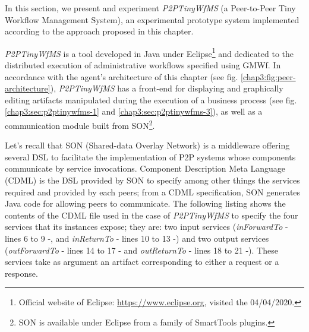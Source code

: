 \label{chap3:sec:p2ptinywfms}

In this section, we present and experiment \textit{P2PTinyWfMS} (a Peer-to-Peer Tiny Workflow Management System), an experimental prototype system implemented according to the approach proposed in this chapter.

\textit{P2PTinyWfMS} is a tool developed in Java under Eclipse\footnote{Official website of Eclipse: \url{https://www.eclipse.org}, visited the 04/04/2020.} and dedicated to the distributed execution of administrative workflows specified using GMWf. 
In accordance with the agent's architecture of this chapter (see fig. \ref{chap3:fig:peer-architecture}), \textit{P2PTinyWfMS} has a front-end for displaying and graphically editing artifacts manipulated during the execution of a business process (see fig. \ref{chap3:sec:p2ptinywfms-1} and \ref{chap3:sec:p2ptinywfms-3}), as well as a communication module built from SON\footnote{SON is available under Eclipse from a family of SmartTools plugins.}. 

Let's recall that SON (Shared-data Overlay Network) \cite{SON} is a middleware offering several DSL to facilitate the implementation of P2P systems whose components communicate by service invocations. 
Component Description Meta Language (CDML) is the DSL provided by SON to specify among other things the services required and provided by each peers; from a CDML specification, SON generates Java code for allowing peers to communicate.
The following listing shows the contents of the CDML file used in the case of \textit{P2PTinyWfMS} to specify the four services that its instances expose; they are: two input services (\textit{inForwardTo} - lines 6 to 9 -, and \textit{inReturnTo} - lines 10 to 13 -) and two output services (\textit{outForwardTo} - lines 14 to 17 - and \textit{outReturnTo} - lines 18 to 21 -). These services take as argument an artifact corresponding to either a request or a response.

